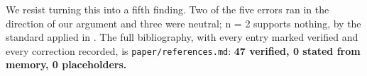 We resist turning this into a fifth finding. Two of the five errors ran in the direction of our
argument and three were neutral; n = 2 supports nothing, by the standard applied in . The
full bibliography, with every entry marked verified and every correction recorded, is
\texttt{paper/references.md}: \textbf{47 verified, 0 stated from memory, 0 placeholders.}
